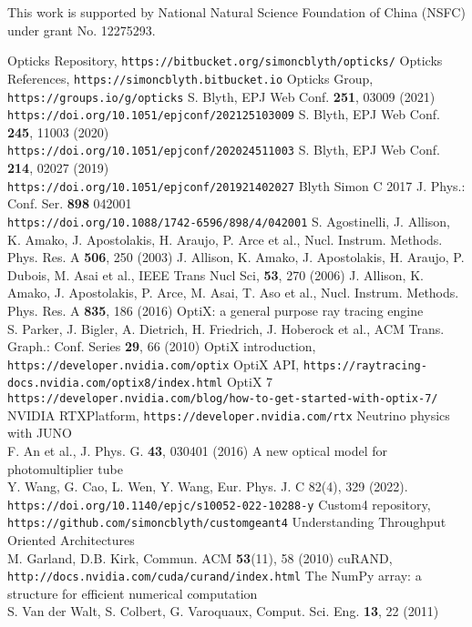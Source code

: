 \documentclass{webofc}
\begin{document}
This work is supported by National Natural Science Foundation of China (NSFC)
under grant No. 12275293.
%
\begin{thebibliography}{}
%
Opticks Repository, {\tt https://bitbucket.org/simoncblyth/opticks/}
Opticks References, {\tt https://simoncblyth.bitbucket.io}
Opticks Group, {\tt https://groups.io/g/opticks}
S. Blyth, EPJ Web Conf. {\bf 251}, 03009 (2021) \\
{\tt https://doi.org/10.1051/epjconf/202125103009}
S. Blyth, EPJ Web Conf. {\bf 245}, 11003 (2020) \\
{\tt https://doi.org/10.1051/epjconf/202024511003}
S. Blyth, EPJ Web Conf. {\bf 214}, 02027 (2019) \\
{\tt https://doi.org/10.1051/epjconf/201921402027}
Blyth Simon C 2017 J. Phys.: Conf. Ser. {\bf 898} 042001 \\
{\tt https://doi.org/10.1088/1742-6596/898/4/042001}
%
S. Agostinelli, J. Allison, K. Amako, J. Apostolakis, H. Araujo, P. Arce et al., Nucl. Instrum. Methods. Phys. Res. A {\bf 506}, 250 (2003)
J. Allison, K. Amako, J. Apostolakis, H. Araujo, P. Dubois, M. Asai et al., IEEE Trans Nucl Sci, {\bf 53}, 270 (2006)
J. Allison, K. Amako, J. Apostolakis, P. Arce, M. Asai, T. Aso et al., Nucl. Instrum. Methods. Phys. Res. A {\bf 835}, 186 (2016)
%
%
OptiX: a general purpose ray tracing engine \\
S. Parker, J. Bigler, A. Dietrich, H. Friedrich, J. Hoberock et al., ACM Trans. Graph.: Conf. Series {\bf 29}, 66 (2010)
OptiX introduction, {\tt https://developer.nvidia.com/optix}
OptiX API, {\tt https://raytracing-docs.nvidia.com/optix8/index.html}
OptiX 7 {\tt https://developer.nvidia.com/blog/how-to-get-started-with-optix-7/}
NVIDIA RTX\texttrademark Platform, {\tt https://developer.nvidia.com/rtx}
Neutrino physics with JUNO \\
F. An et al., J. Phys. G. {\bf 43}, 030401 (2016) 
%
A new optical model for photomultiplier tube\\
Y. Wang, G. Cao, L. Wen, Y. Wang, Eur. Phys. J. C 82(4), 329 (2022).\\
{\tt https://doi.org/10.1140/epjc/s10052-022-10288-y}
%
Custom4 repository, {\tt https://github.com/simoncblyth/customgeant4}
%
Understanding Throughput Oriented Architectures \\
M. Garland, D.B. Kirk, Commun. ACM {\bf 53}(11), 58 (2010) 
cuRAND, {\tt http://docs.nvidia.com/cuda/curand/index.html}
The NumPy array: a structure for efficient numerical computation \\
S. Van der Walt, S. Colbert, G. Varoquaux, Comput. Sci. Eng. {\bf 13}, 22 (2011)
%
\end{thebibliography}
%
\end{document}
